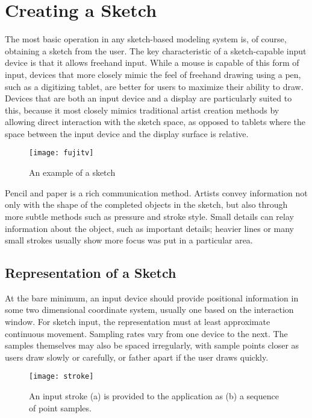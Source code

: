 \chapter{Creating a Sketch}

The most basic operation in any sketch-based modeling system is, of course, obtaining a sketch from the user.
The key characteristic of a sketch-capable input device is that it allows freehand input.
While a mouse is capable of this form of input, devices that more closely mimic the feel of freehand drawing using a pen, such as a digitizing tablet, are better for users to maximize their ability to draw.
Devices that are both an input device and a display are particularly suited to this, because it most closely mimics traditional artist creation methods by allowing direct interaction with the sketch space, as opposed to tablets where the space between the input device and the display surface is relative.

\begin{figure}
\texttt{[image: fujitv]}
\caption{An example of a sketch}
\end{figure}

Pencil and paper is a rich communication method. 
Artists convey information not only with the shape of the completed objects in the sketch, but also through more subtle methods such as pressure and stroke style.
Small details can relay information about the object, such as important details; heavier lines or many small strokes usually show more focus was put in a particular area.

\section{Representation of a Sketch}

At the bare minimum, an input device should provide positional information in some two dimensional coordinate system, usually one based on the interaction window.
For sketch input, the representation must at least approximate continuous movement.
Sampling rates vary from one device to the next.
The samples themselves may also be spaced irregularly, with sample points closer as users draw slowly or carefully, or father apart if the user draws quickly.

\begin{figure}
\texttt{[image: stroke]}
\caption{An input stroke (a) is provided to the application as (b) a sequence of point samples.}
\end{figure}

